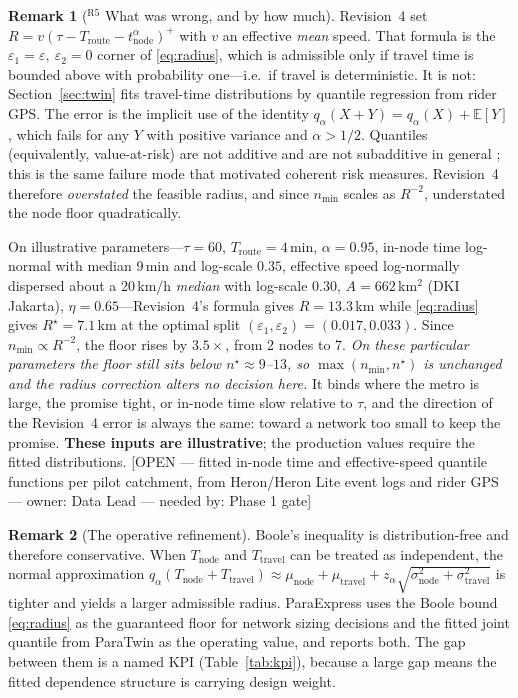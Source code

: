 \documentclass[10pt,twocolumn,letterpaper]{article}
\theoremstyle{definition}
\newtheorem{remark}{Remark}
\newcommand{\OPEN}[3]{{\color{openred}\footnotesize\textsf{[OPEN --- #1 --- owner: #2 --- needed by: #3]}}}
\begin{document}
\begin{remark}[$^{\mathrm{R5}}$ What was wrong, and by how much]
Revision~4 set $R=v(\tau-T_{\mathrm{route}}-t^{\alpha}_{\mathrm{node}})^{+}$ with $v$ an effective \emph{mean} speed. That formula is the $\varepsilon_1=\varepsilon,\ \varepsilon_2=0$ corner of \eqref{eq:radius}, which is admissible only if travel time is bounded above with probability one---i.e.\ if travel is deterministic. It is not: Section~\ref{sec:twin} fits travel-time distributions by quantile regression from rider GPS. The error is the implicit use of the identity $q_\alpha(X+Y)=q_\alpha(X)+\mathbb{E}[Y]$, which fails for any $Y$ with positive variance and $\alpha>1/2$. Quantiles (equivalently, value-at-risk) are not additive and are not subadditive in general \cite{artzner1999,embrechts2002}; this is the same failure mode that motivated coherent risk measures. Revision~4 therefore \emph{overstated} the feasible radius, and since $n_{\min}$ scales as $R^{-2}$, understated the node floor quadratically.

On illustrative parameters---$\tau=60$, $T_{\mathrm{route}}=4$\,min, $\alpha=0.95$, in-node time log-normal with median 9\,min and log-scale $0.35$, effective speed log-normally dispersed about a 20\,km/h \emph{median} with log-scale $0.30$, $A=662$\,km$^2$ (DKI Jakarta), $\eta=0.65$---Revision~4's formula gives $R=13.3$\,km while \eqref{eq:radius} gives $R^\star=7.1$\,km at the optimal split $(\varepsilon_1,\varepsilon_2)=(0.017,0.033)$. Since $n_{\min}\propto R^{-2}$, the floor rises by $3.5\times$, from 2 nodes to 7. \emph{On these particular parameters the floor still sits below $n^\star\approx9$--$13$, so $\max(n_{\min},n^\star)$ is unchanged and the radius correction alters no decision here.} It binds where the metro is large, the promise tight, or in-node time slow relative to $\tau$, and the direction of the Revision~4 error is always the same: toward a network too small to keep the promise. \textbf{These inputs are illustrative}; the production values require the fitted distributions. \OPEN{fitted in-node time and effective-speed quantile functions per pilot catchment, from Heron/Heron Lite event logs and rider GPS}{Data Lead}{Phase 1 gate}
\end{remark}

\begin{remark}[The operative refinement]
Boole's inequality is distribution-free and therefore conservative. When $T_{\mathrm{node}}$ and $T_{\mathrm{travel}}$ can be treated as independent, the normal approximation $q_\alpha(T_{\mathrm{node}}+T_{\mathrm{travel}})\approx\mu_{\mathrm{node}}+\mu_{\mathrm{travel}}+z_\alpha\sqrt{\sigma^2_{\mathrm{node}}+\sigma^2_{\mathrm{travel}}}$ is tighter and yields a larger admissible radius. ParaExpress uses the Boole bound \eqref{eq:radius} as the guaranteed floor for network sizing decisions and the fitted joint quantile from ParaTwin as the operating value, and reports both. The gap between them is a named KPI (Table~\ref{tab:kpi}), because a large gap means the fitted dependence structure is carrying design weight.
\end{remark}
\end{document}

